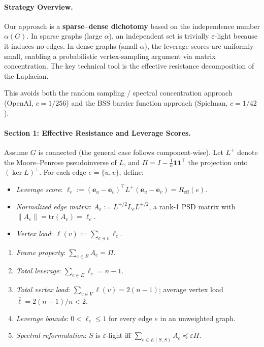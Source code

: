 \paragraph{Strategy Overview.}
Our approach is a \textbf{sparse--dense dichotomy} based on the independence
number $\alpha(G)$.  In sparse graphs (large $\alpha$), an independent set is
trivially $\varepsilon$-light because it induces no edges.  In dense graphs
(small $\alpha$), the leverage scores are uniformly small, enabling a
probabilistic vertex-sampling argument via matrix concentration.  The key
technical tool is the effective resistance decomposition of the Laplacian.

This avoids both the random sampling / spectral concentration approach
(OpenAI, $c = 1/256$) and the BSS barrier function approach (Spielman,
$c = 1/42$).


\paragraph{Section 1: Effective Resistance and Leverage Scores.}

\begin{definition}\label{def:p6-effres}
Assume $G$ is connected (the general case follows component-wise).  Let
$L^+$ denote the Moore--Penrose pseudoinverse of $L$, and
$\Pi = I - \frac{1}{n}\mathbf{1}\mathbf{1}^\top$ the projection onto
$(\ker L)^\perp$.  For each edge $e = \{u,v\}$, define:
\begin{itemize}
  \item \emph{Leverage score}:
    $\ell_e := (\mathbf{e}_u - \mathbf{e}_v)^\top L^+
    (\mathbf{e}_u - \mathbf{e}_v) = R_{\mathrm{eff}}(e)$.
  \item \emph{Normalized edge matrix}:
    $A_e := L^{+/2} L_e L^{+/2}$, a rank-1 PSD matrix with
    $\|A_e\| = \mathrm{tr}(A_e) = \ell_e$.
  \item \emph{Vertex load}:
    $\ell(v) := \sum_{e \ni v} \ell_e$.
\end{itemize}
\end{definition}

\begin{lemma}\label{lem:p6-fund}
\begin{enumerate}
  \item \emph{Frame property}: $\sum_{e \in E} A_e = \Pi$.
  \item \emph{Total leverage}: $\sum_{e \in E} \ell_e = n - 1$.
  \item \emph{Total vertex load}: $\sum_{v \in V} \ell(v) = 2(n-1)$;
    average vertex load $\bar{\ell} = 2(n-1)/n < 2$.
  \item \emph{Leverage bounds}: $0 < \ell_e \leq 1$ for every edge $e$ in
    an unweighted graph.
  \item \emph{Spectral reformulation}: $S$ is $\varepsilon$-light iff
    $\sum_{e \in E(S,S)} A_e \preceq \varepsilon \Pi$.
\end{enumerate}
\end{lemma}

